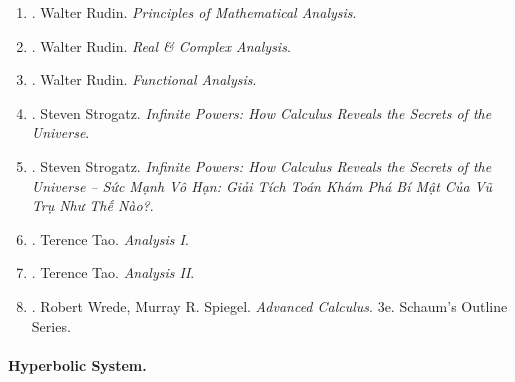 \documentclass{article}
\begin{document}
\begin{enumerate}
	\item \cite{Rudin1976}. {\sc Walter Rudin}. {\it Principles of Mathematical Analysis}.\hfill{\sf[done]}

	\item \cite{Rudin1987}. {\sc Walter Rudin}. {\it Real \& Complex Analysis}.

	\item \cite{Rudin1991}. {\sc Walter Rudin}. {\it Functional Analysis}.

	\item \cite{Strogatz_infinite_power}. {\sc Steven Strogatz}. {\it Infinite Powers: How Calculus Reveals the Secrets of the Universe}.

	\item \cite{Strogatz_infinite_power_VN}. {\sc Steven Strogatz}. {\it Infinite Powers: How Calculus Reveals the Secrets of the Universe -- Sức Mạnh Vô Hạn: Giải Tích Toán Khám Phá Bí Mật Của Vũ Trụ Như Thế Nào?}.\hfill{\sf[done]}

	\item \cite{Tao_analysis_1}. {\sc Terence Tao}. {\it Analysis I}.

	\item \cite{Tao_analysis_2}. {\sc Terence Tao}. {\it Analysis II}.

	\item \cite{Wrede_Spiegel2010}. {\sc Robert Wrede, Murray R. Spiegel}. {\it Advanced Calculus}. 3e. Schaum's Outline Series.
\end{enumerate}

\paragraph{Hyperbolic System.}
\end{document}
